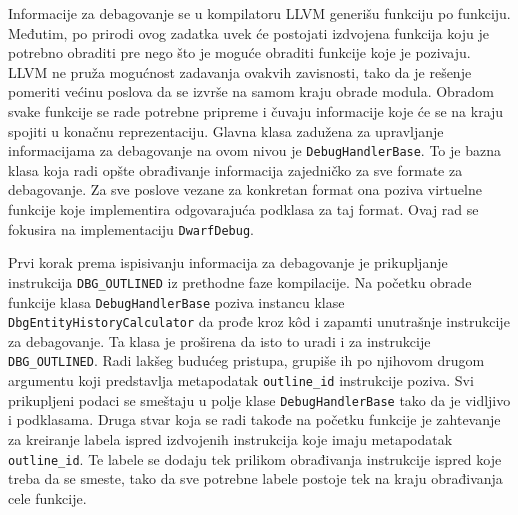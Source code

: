 \documentclass[12pt,oneside]{memoir}
\begin{document}
Informacije za debagovanje se u kompilatoru LLVM generišu funkciju po funkciju.
Međutim, po prirodi ovog zadatka uvek će postojati izdvojena funkcija koju je potrebno obraditi pre nego što je moguće obraditi funkcije koje je pozivaju.
LLVM ne pruža mogućnost zadavanja ovakvih zavisnosti, tako da je rešenje pomeriti većinu poslova da se izvrše na samom kraju obrade modula.
Obradom svake funkcije se rade potrebne pripreme i čuvaju informacije koje će se na kraju spojiti u konačnu reprezentaciju.
Glavna klasa zadužena za upravljanje informacijama za debagovanje na ovom nivou je \verb|DebugHandlerBase|.
To je bazna klasa koja radi opšte obrađivanje informacija zajedničko za sve formate za debagovanje.
Za sve poslove vezane za konkretan format ona poziva virtuelne funkcije koje implementira odgovarajuća podklasa za taj format.
Ovaj rad se fokusira na implementaciju \verb|DwarfDebug|.

Prvi korak prema ispisivanju informacija za debagovanje je prikupljanje instrukcija \verb|DBG_OUTLINED| iz prethodne faze kompilacije.
Na početku obrade funkcije klasa \verb|DebugHandlerBase| poziva instancu klase \verb|DbgEntityHistoryCalculator| da prođe kroz k\^od i zapamti unutrašnje instrukcije za debagovanje.
Ta klasa je proširena da isto to uradi i za instrukcije \verb|DBG_OUTLINED|.
Radi lakšeg budućeg pristupa, grupiše ih po njihovom drugom argumentu koji predstavlja metapodatak \verb|outline_id| instrukcije poziva. %
Svi prikupljeni podaci se smeštaju u polje klase \verb|DebugHandlerBase| tako da je vidljivo i podklasama.
Druga stvar koja se radi takođe na početku funkcije je zahtevanje za kreiranje labela ispred izdvojenih instrukcija koje imaju metapodatak \verb|outline_id|.
Te labele se dodaju tek prilikom obrađivanja instrukcije ispred koje treba da se smeste, tako da sve potrebne labele postoje tek na kraju obrađivanja cele funkcije.
\end{document}
